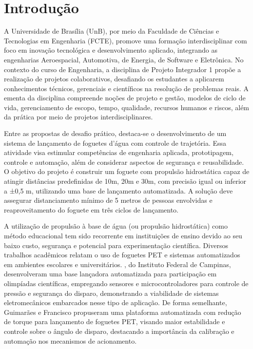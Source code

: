 \chapter[Introdução]{Introdução}

A Universidade de Brasília (UnB), por meio da Faculdade de Ciências e Tecnologias em Engenharia (FCTE), promove uma formação interdisciplinar com foco em inovação tecnológica e desenvolvimento aplicado, integrando as engenharias Aeroespacial, Automotiva, de Energia, de Software e Eletrônica. No contexto do curso de Engenharia, a disciplina de Projeto Integrador 1 propõe a realização de projetos colaborativos, desafiando os estudantes a aplicarem conhecimentos técnicos, gerenciais e científicos na resolução de problemas reais. A ementa da disciplina compreende noções de projeto e gestão, modelos de ciclo de vida, gerenciamento de escopo, tempo, qualidade, recursos humanos e riscos, além da prática por meio de projetos interdisciplinares.

Entre as propostas de desafio prático, destaca-se o desenvolvimento de um sistema de lançamento de foguetes d’água com controle de trajetória. Essa atividade visa estimular competências de engenharia aplicada, prototipagem, controle e automação, além de considerar aspectos de segurança e reusabilidade. O objetivo do projeto é construir um foguete com propulsão hidrostática capaz de atingir distâncias predefinidas de 10m, 20m e 30m, com precisão igual ou inferior a ±0,5 m, utilizando uma base de lançamento automatizada. A solução deve assegurar distanciamento mínimo de 5 metros de pessoas envolvidas e reaproveitamento do foguete em três ciclos de lançamento.

A utilização de propulsão à base de água (ou propulsão hidrostática) como método educacional tem sido recorrente em instituições de ensino devido ao seu baixo custo, segurança e potencial para experimentação científica. Diversos trabalhos acadêmicos relatam o uso de foguetes PET e sistemas automatizados em ambientes escolares e universitários. \cite{yukimitsu2020}, do Instituto Federal de Campinas, desenvolveram uma base lançadora automatizada para participação em olimpíadas científicas, empregando sensores e microcontroladores para controle de pressão e segurança do disparo, demonstrando a viabilidade de sistemas eletromecânicos embarcados nesse tipo de aplicação. De forma semelhante, Guimarães e Francisco \cite{guimaraes2020foguete} propuseram uma plataforma automatizada com redução de torque para lançamento de foguetes PET, visando maior estabilidade e controle sobre o ângulo de disparo, destacando a importância da calibração e automação nos mecanismos de acionamento.

